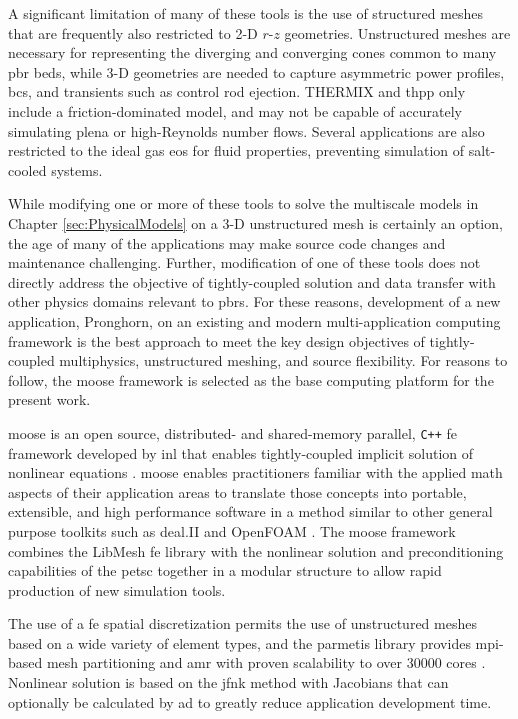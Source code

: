 A significant limitation of many of these tools is the use of structured meshes that are frequently also restricted to 2-D $r$-$z$ geometries. Unstructured meshes are necessary for representing the diverging and converging cones common to many \gls{pbr} beds, while 3-D geometries are needed to capture asymmetric power profiles, \glspl{bc}, and transients such as control rod ejection. THERMIX and \gls{thpp} only include a friction-dominated model, and may not be capable of accurately simulating plena or high-Reynolds number flows. Several applications are also restricted to the ideal gas \gls{eos} for fluid properties, preventing simulation of salt-cooled systems. 

While modifying one or more of these tools to solve the multiscale models in Chapter \ref{sec:PhysicalModels} on a 3-D unstructured mesh is certainly an option, the age of many of the applications may make source code changes and maintenance challenging. Further, modification of one of these tools does not directly address the objective of tightly-coupled solution and data transfer with other physics domains relevant to \glspl{pbr}. For these reasons, development of a new application, Pronghorn, on an existing and modern multi-application computing framework is the best approach to meet the key design objectives of tightly-coupled multiphysics, unstructured meshing, and source flexibility. For reasons to follow, the \gls{moose} framework is selected as the base computing platform for the present work.

\gls{moose} is an open source, distributed- and shared-memory parallel, \texttt{C++} \gls{fe} framework developed by \gls{inl} that enables tightly-coupled implicit solution of nonlinear equations \cite{gaston,moose}. \gls{moose} enables practitioners familiar with the applied math aspects of their application areas to translate those concepts into portable, extensible, and high performance software in a method similar to other general purpose toolkits such as deal.II \cite{dealII91} and OpenFOAM \cite{openfoam}. The \gls{moose} framework combines the LibMesh \gls{fe} library \cite{libMeshPaper} with the nonlinear solution and preconditioning capabilities of the \gls{petsc} together in a modular structure to allow rapid production of new simulation tools. 

The use of a \gls{fe} spatial discretization permits the use of unstructured meshes based on a wide variety of element types, and the \gls{parmetis} library provides \gls{mpi}-based mesh partitioning and \gls{amr} with proven scalability to over 30000 cores \cite{kong}. Nonlinear solution is based on the \gls{jfnk} method with Jacobians that can optionally be calculated by \gls{ad} to greatly reduce application development time. 

